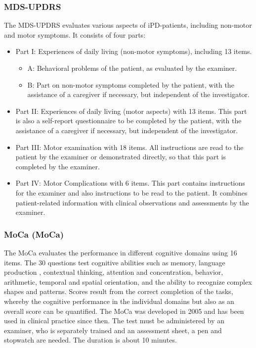 \subsubsection{\acl{MDS-UPDRS}}
The \ac{MDS-UPDRS} evaluates various aspects of \ac{iPD}-patients, including non-motor and motor symptoms. It consists of four parts:
\begin{itemize}
\item Part I: Experiences of daily living (non-motor symptoms), including 13 items.
\begin{itemize}
\item A: Behavioral problems of the patient, as evaluated by the examiner.
\item B: Part on non-motor symptoms completed by the patient, with the assistance of a caregiver if necessary, but independent of the investigator.
\end{itemize}
\item Part II: Experiences of daily living (motor aspects) with 13 items. This part is also a self-report questionnaire to be completed by the patient, with the assistance of a caregiver if necessary, but independent of the investigator.
\item Part III: Motor examination with 18 items. All instructions are read to the patient by the examiner or demonstrated directly, so that this part is completed by the examiner.
\item Part IV: Motor Complications with 6 items. This part contains instructions for the examiner and also instructions to be read to the patient. It combines patient-related information with clinical observations and assessments by the examiner.
\end{itemize}

\subsubsection{\acl{MoCa} (\acs{MoCa})}
The \acl{MoCa} evaluates the performance in different cognitive domains using 16 items. The 30 questions test cognitive abilities such as memory, language production , contextual thinking, attention and concentration, behavior, arithmetic, temporal and spatial orientation, and the ability to recognize complex shapes and patterns. Scores result from the correct completion of the tasks, whereby the cognitive performance in the individual domains but also as an overall score can be quantified. The \ac{MoCa} was developed in 2005 \cite{nasreddine2005moca} and has been used in clinical practice since then. The test must be administered by an examiner, who is separately trained and an assessment sheet, a pen and stopwatch are needed. The duration is about 10 minutes.

